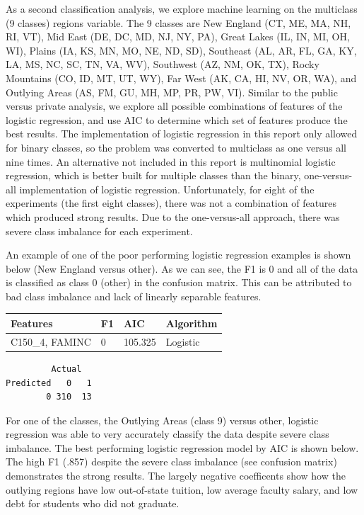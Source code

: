 \documentclass[10pt]{article}
\begin{document}
As a second classification analysis, we explore machine learning on the multiclass (9 classes) regions variable. The 9 classes are New England (CT, ME, MA, NH, RI, VT), Mid East (DE, DC, MD, NJ, NY, PA), Great Lakes (IL, IN, MI, OH, WI), Plains (IA, KS, MN, MO, NE, ND, SD), Southeast (AL, AR, FL, GA, KY, LA, MS, NC, SC, TN, VA, WV), Southwest (AZ, NM, OK, TX), Rocky Mountains (CO, ID, MT, UT, WY), Far West (AK, CA, HI, NV, OR, WA), and Outlying Areas (AS, FM, GU, MH, MP, PR, PW, VI). Similar to the public versus private analysis, we explore all possible combinations of features of the logistic regression, and use AIC to determine which set of features produce the best results. The implementation of logistic regression in this report only allowed for binary classes, so the problem was converted to multiclass as one versus all nine times. An alternative not included in this report is multinomial logistic regression, which is better built for multiple classes than the binary, one-versus-all implementation of logistic regression. Unfortunately, for eight of the experiments (the first eight classes), there was not a combination of features which produced strong results. Due to the one-versus-all approach, there was severe class imbalance for each experiment.

An example of one of the poor performing logistic regression examples is shown below (New England versus other). As we can see, the F1 is 0 and all of the data is classified as class 0 (other) in the confusion matrix. This can be attributed to bad class imbalance and lack of linearly separable features.

\begin{center}
\begin{tabular}{ |P{4cm}|P{2cm}|P{2cm}|P{2cm}| }
 \hline Features & F1 & AIC & Algorithm \\ \hline
 C150\_4, FAMINC  & 0 & 105.325 & Logistic \\ \hline 
\end{tabular}
\end{center}

\begin{lstlisting}
         Actual
Predicted   0   1
        0 310  13
\end{lstlisting}

For one of the classes, the Outlying Areas (class 9) versus other, logistic regression was able to very accurately classify the data despite severe class imbalance. The best performing logistic regression model by AIC is shown below. The high F1 (.857) despite the severe class imbalance (see confusion matrix) demonstrates the strong results. The largely negative coefficents show how the outlying regions have low out-of-state tuition, low average faculty salary, and low debt for students who did not graduate.
\end{document}
